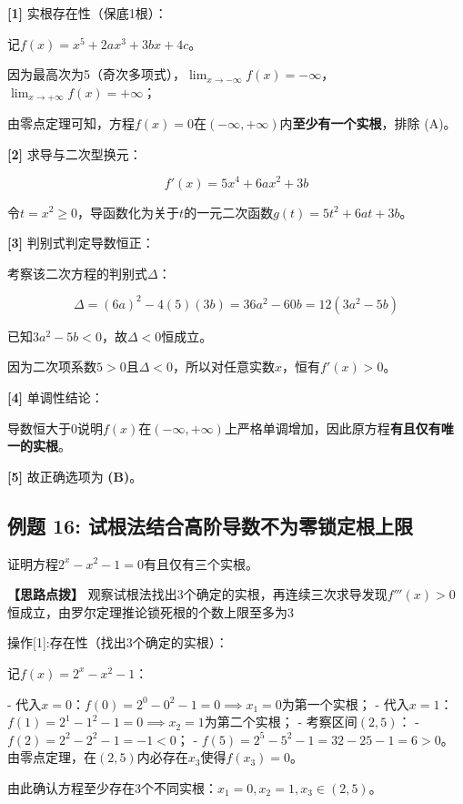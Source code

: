 \documentclass[11pt,a4paper,UTF8]{ctexart}
\begin{document}
\begin{solbox}[分步推导与答题规范]
\textbf{[1]} 实根存在性（保底1根）：

记$f(x) = x^5 + 2ax^3 + 3bx + 4c$。

因为最高次为5（奇次多项式），$\lim_{x \to -\infty} f(x) = -\infty$，$\lim_{x \to +\infty} f(x) = +\infty$；

由零点定理可知，方程$f(x) = 0$在$(-\infty, +\infty)$内\textbf{至少有一个实根}，排除 (A)。

\textbf{[2]} 求导与二次型换元：


\begin{equation*}
f'(x) = 5x^4 + 6ax^2 + 3b
\end{equation*}


令$t = x^2 \ge 0$，导函数化为关于$t$的一元二次函数$g(t) = 5t^2 + 6at + 3b$。

\textbf{[3]} 判别式判定导数恒正：

考察该二次方程的判别式$\Delta$：


\begin{equation*}
\Delta = (6a)^2 - 4(5)(3b) = 36a^2 - 60b = 12(3a^2 - 5b)
\end{equation*}


已知$3a^2 - 5b < 0$，故$\Delta < 0$恒成立。

因为二次项系数$5 > 0$且$\Delta < 0$，所以对任意实数$x$，恒有$f'(x) > 0$。

\textbf{[4]} 单调性结论：

导数恒大于0说明$f(x)$在$(-\infty, +\infty)$上严格单调增加，因此原方程\textbf{有且仅有唯一的实根}。

\textbf{[5]} 故正确选项为 \textbf{(B)}。
\end{solbox}


\subsection{例题 16: 试根法结合高阶导数不为零锁定根上限}

证明方程$2^x - x^2 - 1 = 0$有且仅有三个实根。

\textbf{\color{DeepPurple}【思路点拨】} 观察试根法找出3个确定的实根，再连续三次求导发现$f'''(x) > 0$恒成立，由罗尔定理推论锁死根的个数上限至多为3


操作[1]:存在性（找出3个确定的实根）：

\begin{solbox}[分步推导与答题规范]
记$f(x) = 2^x - x^2 - 1$：

- 代入$x = 0$：$f(0) = 2^0 - 0^2 - 1 = 0 \implies x_1 = 0$为第一个实根；
- 代入$x = 1$：$f(1) = 2^1 - 1^2 - 1 = 0 \implies x_2 = 1$为第二个实根；
- 考察区间$(2, 5)$：
 - $f(2) = 2^2 - 2^2 - 1 = -1 < 0$；
 - $f(5) = 2^5 - 5^2 - 1 = 32 - 25 - 1 = 6 > 0$。
 由零点定理，在$(2, 5)$内必存在$x_3$使得$f(x_3) = 0$。

由此确认方程至少存在3个不同实根：$x_1 = 0, x_2 = 1, x_3 \in (2, 5)$。
\end{solbox}
\end{document}
